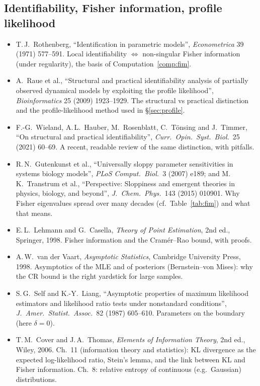 \documentclass[11pt]{article}
\theoremstyle{definition}
\theoremstyle{remark}
\begin{document}
\subsection*{Identifiability, Fisher information, profile likelihood}
\begin{itemize}
\item[I1] T.\,J.\ Rothenberg, ``Identification in parametric models'', \emph{Econometrica} 39 (1971) 577--591. Local identifiability $\Leftrightarrow$ non-singular Fisher information (under regularity), the basis of Computation~\ref{comp:fim}.
\item[I2$^\star$] A.\ Raue et al., ``Structural and practical identifiability analysis of partially observed dynamical models by exploiting the profile likelihood'', \emph{Bioinformatics} 25 (2009) 1923--1929. The structural vs practical distinction and the profile-likelihood method used in \S\ref{sec:profile}.
\item[I3$^\star$] F.-G.\ Wieland, A.\,L.\ Hauber, M.\ Rosenblatt, C.\ T\"onsing and J.\ Timmer, ``On structural and practical identifiability'', \emph{Curr.\ Opin.\ Syst.\ Biol.}\ 25 (2021) 60--69. A recent, readable review of the same distinction, with pitfalls.
\item[I4] R.\,N.\ Gutenkunst et al., ``Universally sloppy parameter sensitivities in systems biology models'', \emph{PLoS Comput.\ Biol.}\ 3 (2007) e189; and M.\,K.\ Transtrum et al., ``Perspective: Sloppiness and emergent theories in physics, biology, and beyond'', \emph{J.\ Chem.\ Phys.}\ 143 (2015) 010901. Why Fisher eigenvalues spread over many decades (cf.\ Table~\ref{tab:fim}) and what that means.
\item[I5] E.\,L.\ Lehmann and G.\ Casella, \emph{Theory of Point Estimation}, 2nd ed., Springer, 1998. Fisher information and the Cram\'er--Rao bound, with proofs.
\item[I6] A.\,W.\ van der Vaart, \emph{Asymptotic Statistics}, Cambridge University Press, 1998. Asymptotics of the MLE and of posteriors (Bernstein--von Mises): why the CR bound is the right yardstick for large samples.
\item[I7] S.\,G.\ Self and K.-Y.\ Liang, ``Asymptotic properties of maximum likelihood estimators and likelihood ratio tests under nonstandard conditions'', \emph{J.\ Amer.\ Statist.\ Assoc.}\ 82 (1987) 605--610. Parameters on the boundary (here $\delta=0$).
\item[I8$^\star$] T.\,M.\ Cover and J.\,A.\ Thomas, \emph{Elements of Information Theory}, 2nd ed., Wiley, 2006. Ch.~11 (information theory and statistics): KL divergence as the expected log-likelihood ratio, Stein's lemma, and the link between KL and Fisher information. Ch.~8: relative entropy of continuous (e.g.\ Gaussian) distributions.

\end{itemize}
\end{document}
